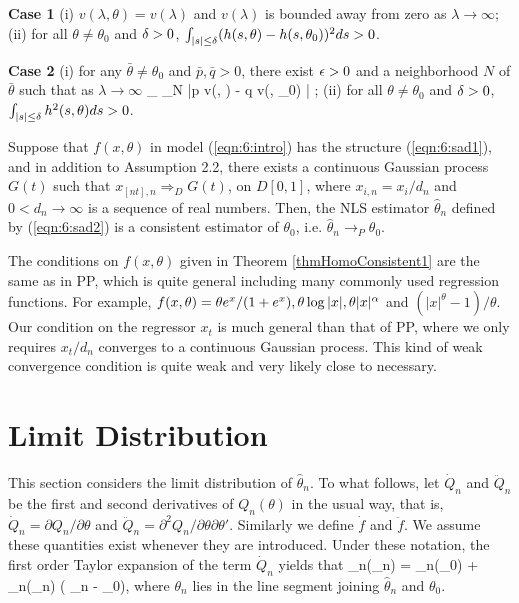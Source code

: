  {\bf Case 1} (i) $v(\lambda, \theta)  = v(\lambda)$ and $v(\lambda)$ is bounded away from zero as $\lambda \to \infty$; (ii) for all $\theta \ne \theta_0$ and $\delta > 0$, $\int_{|s| \le \delta} (h(s, \theta) - h(s, \theta_0))^2 ds > 0$.

 {\bf Case 2} (i) for any $\bar{\theta} \ne \theta_0$ and $\bar{p}, \bar{q} > 0$, there exist $\epsilon > 0$ and a neighborhood $N$ of $\bar{\theta}$ such that as $\lambda \to \infty$
\be
\inf_{} \inf_{\theta \in N} |p v(\lambda, \theta) - q v(\lambda, \theta_0) | \to \infty;
\ee
(ii) for all $\theta \ne \theta_0$ and $\delta > 0$, $\int_{|s| \le \delta} h^2(s, \theta)  ds > 0$.


\begin{thm}  Suppose that $f(x, \theta)$ in model (\ref {eqn:6:intro}) has the structure (\ref {eqn:6:sad1}), and in addition to Assumption 2.2, there exists a continuous Gaussian process $G(t)$ such that $x_{[nt], n} \Rightarrow_D G(t)$, on $D[0,1]$, where $x_{i,n} = x_i / d_n$  and $0 < d_n \to \infty$ is a sequence of real numbers. Then,
 the NLS estimator $\hat{\theta}_n$ defined by (\ref {eqn:6:sad2}) is a consistent estimator of $\theta_0$, i.e. $\hat{\theta}_n \rightarrow_P \theta_0$.
\end{thm}





\begin{rem} The conditions on $f(x, \theta)$ given in Theorem \ref {thmHomoConsistent1} are the same as in PP, which is quite general including many commonly used regression functions. For example, $f(x, \theta) = \theta e^{x}/(1 + e^x), \theta \log |x|, \theta |x|^\alpha$ and $(|x|^\theta - 1)/\theta$.  Our condition on the regressor $x_t$ is much general than that of PP, where we only requires $x_t / d_n$ converges to a continuous Gaussian  process. This kind of weak convergence condition is quite weak and very likely close to necessary.
\end{rem}



\section{Limit Distribution}
This section considers the limit distribution of $\hat{\theta}_n$. To what follows,  let $\dot{Q}_n$ and $\ddot{Q}_n$ be the first and second derivatives of $Q_n(\theta)$ in the usual way, that is, $\dot{Q}_n=\partial Q_n / \partial \theta$ and $\ddot{Q}_n=\partial^2 Q_n / \partial \theta \partial \theta'$. Similarly we define $\dot{f}$  and $\ddot{f}$. We assume these quantities exist whenever they are introduced. Under these notation,  the first order Taylor expansion of the term $\dot{Q}_n$ yields that
\be
{}_n(\hat{\theta}_n) = _n(\theta_0) + _n(\theta_n) ( \hat{\theta}_n - \theta_0), 
\ee
where $\theta_n$ lies in the line segment joining $\hat{\theta}_n$ and $\theta_0$.

